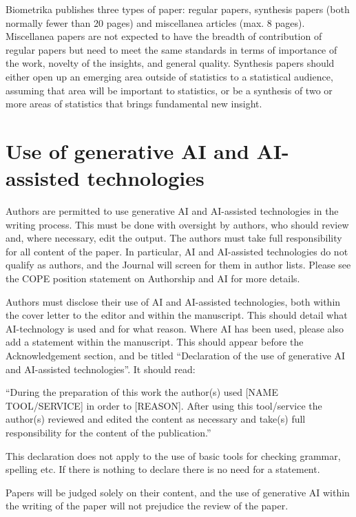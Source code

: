 \documentclass[lineno]{biometrika}
\begin{document}
Biometrika publishes three types of paper: regular papers, synthesis papers (both normally
fewer than 20 pages) and miscellanea articles (max. 8 pages). Miscellanea papers are not
expected to have the breadth of contribution of regular papers but need to meet the same
standards in terms of importance of the work, novelty of the insights, and general quality.
Synthesis papers should either open up an emerging area outside of statistics to a statistical
audience, assuming that area will be important to statistics, or be a synthesis of two or more
areas of statistics that brings fundamental new insight.

\section{Use of generative AI and AI-assisted technologies}
Authors are permitted to use generative AI and AI-assisted technologies in the writing process. This must be done with oversight by authors, who should review and, where necessary, edit the output. The authors must take full responsibility for all content of the paper. In particular, AI and AI-assisted technologies do not qualify as authors, and the Journal will screen for them in author lists. Please see the COPE position statement on Authorship and AI for more details.
 
Authors must disclose their use of AI and AI-assisted technologies, both within the cover letter to the editor and within the manuscript. This should detail what AI-technology is used and for what reason. Where AI has been used, please also add a statement within the manuscript. This should appear before the Acknowledgement section, and be titled ``Declaration of the use of generative AI and AI-assisted technologies''. It should read:
 
``During the preparation of this work the author(s) used [NAME TOOL/SERVICE] in order to [REASON]. After using this tool/service the author(s) reviewed and edited the content as necessary and take(s) full responsibility for the content of the publication.''
 
This declaration does not apply to the use of basic tools for checking grammar, spelling etc. If there is nothing to declare there is no need for a statement.
 
Papers will be judged solely on their content, and the use of generative AI within the writing of the paper will not prejudice the review of the paper.
\end{document}
